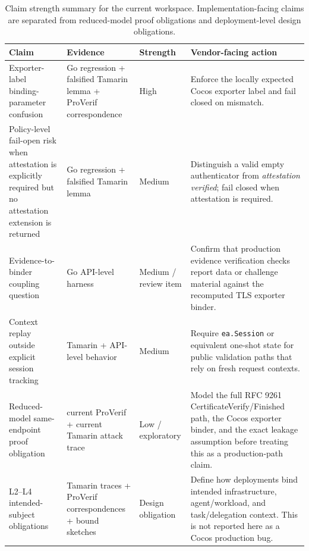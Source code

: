 \documentclass[11pt,a4paper]{article}
\begin{document}
\begin{table}[H]
\centering
\scriptsize
\renewcommand{\arraystretch}{1.18}
\begin{tabularx}{\textwidth}{@{}>{\raggedright\arraybackslash}p{}>{\raggedright\arraybackslash}p{}>{\raggedright\arraybackslash}p{}>{\raggedright\arraybackslash}X@{}}
\toprule
\textbf{Claim} & \textbf{Evidence} & \textbf{Strength} & \textbf{Vendor-facing action} \\
\midrule
Exporter-label binding-parameter confusion & Go regression + falsified Tamarin lemma + ProVerif correspondence & High & Enforce the locally expected Cocos exporter label and fail closed on mismatch. \\
Policy-level fail-open risk when attestation is explicitly required but no attestation extension is returned & Go regression + falsified Tamarin lemma & Medium & Distinguish a valid empty authenticator from \emph{attestation verified}; fail closed when attestation is required. \\
Evidence-to-binder coupling question & Go API-level harness & Medium / review item & Confirm that production evidence verification checks report data or challenge material against the recomputed TLS exporter binder. \\
Context replay outside explicit session tracking & Tamarin + API-level behavior & Medium & Require \texttt{ea.Session} or equivalent one-shot state for public validation paths that rely on fresh request contexts. \\
Reduced-model same-endpoint proof obligation & current ProVerif + current Tamarin attack trace\footnotemark & Low / exploratory & Model the full RFC 9261 CertificateVerify/Finished path, the Cocos exporter binder, and the exact leakage assumption before treating this as a production-path claim. \\
L2--L4 intended-subject obligations & Tamarin traces + ProVerif correspondences + bound sketches & Design obligation & Define how deployments bind intended infrastructure, agent/workload, and task/delegation context. This is not reported here as a Cocos production bug. \\
\bottomrule
\end{tabularx}
\renewcommand{\arraystretch}{1.0}
\caption{Claim strength summary for the current workspace. Implementation-facing claims are separated from reduced-model proof obligations and deployment-level design obligations.}
\label{tab:findings-summary}
\end{table}
\end{document}
